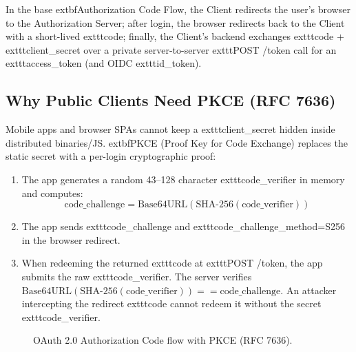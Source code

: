 In the base 	extbf{Authorization Code Flow}, the Client redirects the user's browser to the Authorization Server; after login, the browser redirects back to the Client with a short-lived 	exttt{code}; finally, the Client's backend exchanges 	exttt{code} + 	exttt{client\_secret} over a private server-to-server 	exttt{POST /token} call for an 	exttt{access\_token} (and OIDC 	exttt{id\_token}).

\subsection{Why Public Clients Need PKCE (RFC 7636)}

Mobile apps and browser SPAs cannot keep a 	exttt{client\_secret} hidden inside distributed binaries/JS. 	extbf{PKCE (Proof Key for Code Exchange)} \cite{rfc7636} replaces the static secret with a per-login cryptographic proof:
\begin{enumerate}[leftmargin=15pt]
  \item The app generates a random 43--128 character 	exttt{code\_verifier} in memory and computes:
  $$\text{code\_challenge} = \text{Base64URL}(\text{SHA-256}(\text{code\_verifier}))$$
  \item The app sends 	exttt{code\_challenge} and 	exttt{code\_challenge\_method=S256} in the browser redirect.
  \item When redeeming the returned 	exttt{code} at 	exttt{POST /token}, the app submits the raw 	exttt{code\_verifier}. The server verifies $\text{Base64URL}(\text{SHA-256}(\text{code\_verifier})) == \text{code\_challenge}$. An attacker intercepting the redirect 	exttt{code} cannot redeem it without the secret 	exttt{code\_verifier}.
\end{enumerate}

\begin{figure}[htbp]
\centering
{}
\caption{OAuth 2.0 Authorization Code flow with PKCE (RFC 7636).}
\label{fig:v1-ch06-pkce-flow}
\end{figure}

